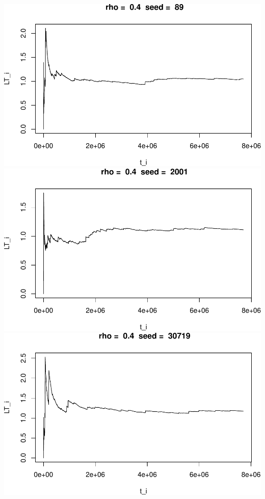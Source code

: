 \documentclass[]{article}
\begin{document}
\includegraphics{003_files/figure-latex/unnamed-chunk-14-7.pdf}
\includegraphics{003_files/figure-latex/unnamed-chunk-14-8.pdf}
\includegraphics{003_files/figure-latex/unnamed-chunk-14-9.pdf}
\end{document}
